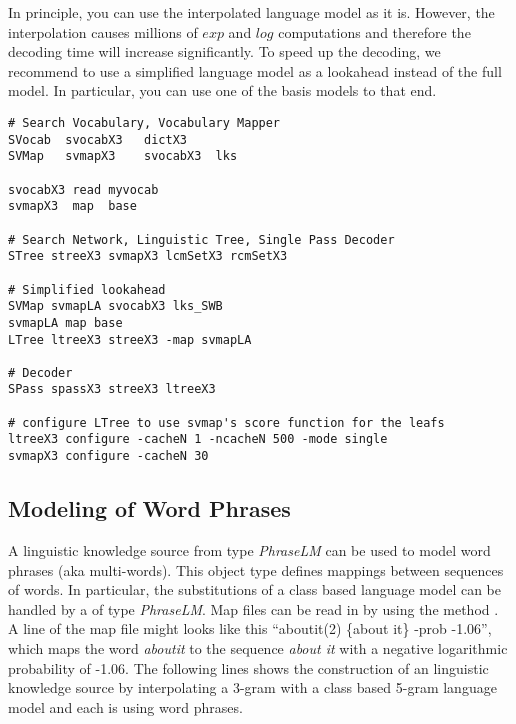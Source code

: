 In principle, you  can   use the interpolated  language  model   as it
is.  However, the  interpolation causes  millions of   $exp$ and $log$
computations and    therefore   the   decoding  time   will   increase
significantly. To    speed up the  decoding,  we  recommend   to use a
simplified language model as a lookahead instead  of the full model. In
particular, you can use one of the basis models to that end.

\begin{verbatim}
# Search Vocabulary, Vocabulary Mapper
SVocab  svocabX3   dictX3
SVMap   svmapX3    svocabX3  lks

svocabX3 read myvocab
svmapX3  map  base

# Search Network, Linguistic Tree, Single Pass Decoder
STree streeX3 svmapX3 lcmSetX3 rcmSetX3 

# Simplified lookahead
SVMap svmapLA svocabX3 lks_SWB
svmapLA map base
LTree ltreeX3 streeX3 -map svmapLA

# Decoder
SPass spassX3 streeX3 ltreeX3

# configure LTree to use svmap's score function for the leafs
ltreeX3 configure -cacheN 1 -ncacheN 500 -mode single 
svmapX3 configure -cacheN 30
\end{verbatim}


\subsection{Modeling of Word Phrases}

A linguistic knowledge source from type {\em PhraseLM}  can be used to
model word  phrases  (aka  multi-words).   This  object  type  defines
mappings between sequences of  words. In particular, the substitutions
of   a    class  based   language   model  can   be      handled by  a
  of type {\em  PhraseLM}.  Map files can be read
in by using  the method .   A line  of the
map   file might looks  like    this ``aboutit(2) \{about it\}   -prob
-1.06'', which maps the word {\em aboutit} to  the sequence {\em about
it}  with a negative logarithmic  probability of -1.06.  The following
lines  shows  the construction  of  an linguistic knowledge  source by
interpolating a  3-gram with a class based   5-gram language model and
each is using word phrases.

